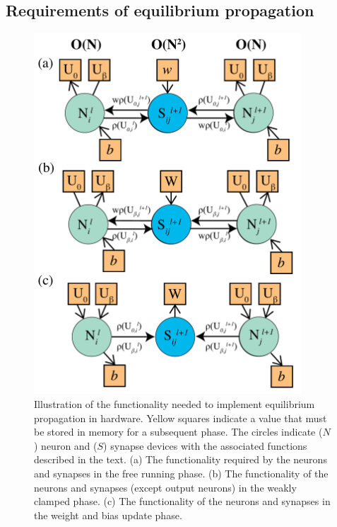 \documentclass[utf8]{frontiersSCNS}
\begin{document}
\begin{appendices}
\subsection{Requirements of equilibrium propagation}


\begin{figure}
\begin{center}
\includegraphics[width=10cm]{figures/eq_prop_sb.pdf}
\end{center}
\caption{Illustration of the functionality needed to implement equilibrium propagation in hardware. Yellow squares indicate a value that must be stored in memory for a subsequent phase. The circles indicate ($N$) neuron and ($S$) synapse devices with the associated functions described in the text. (a) The functionality required by the neurons and synapses in the free running phase. (b) The functionality of the neurons and synapses (except output neurons) in the weakly clamped phase. (c) The functionality of the neurons and synapses in the weight and bias update phase.} \label{fig:eq_prop}
\end{figure}


\end{appendices}
\end{document}
